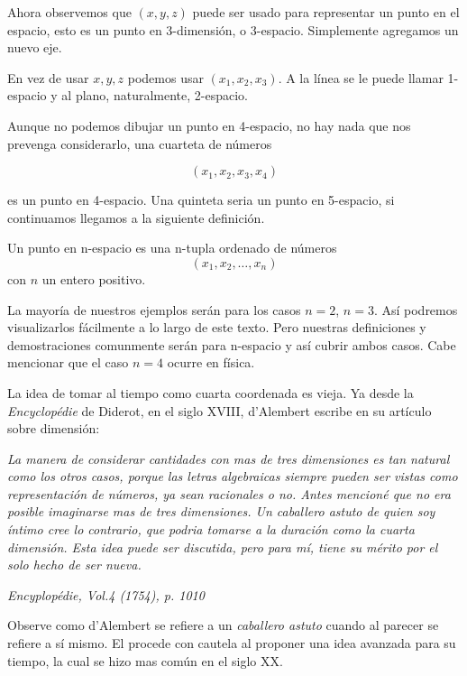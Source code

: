 Ahora observemos que $(x,y,z)$ puede ser usado para representar un punto en el espacio, esto es un
punto en 3-dimensión, o 3-espacio. Simplemente agregamos un nuevo eje.

En vez de usar $x,y,z$ podemos usar $(x_{1},x_{2},x_{3})$. A la línea se le puede llamar 1-espacio y
al plano, naturalmente, 2-espacio.

Aunque no podemos dibujar un punto en 4-espacio, no hay nada que nos prevenga considerarlo, una cuarteta
de números

$$(x_{1},x_{2},x_{3},x_{4})$$

es un punto en 4-espacio. Una quinteta seria un punto en 5-espacio, si continuamos llegamos a la siguiente
definición.

\begin{definition}
    Un punto en n-espacio es una n-tupla ordenado de números
    $$ (x_{1},x_{2}, \ldots ,x_{n}) $$
    con $n$ un entero positivo.
\end{definition}

La mayor\'ia de nuestros ejemplos serán para los casos $n=2$, $n=3$. Así podremos visualizarlos f\'acilmente a
lo largo de este texto. Pero nuestras definiciones y demostraciones comunmente serán para n-espacio y así
cubrir ambos casos. Cabe mencionar que el caso $n=4$ ocurre en física.

La idea de tomar al tiempo como cuarta coordenada es vieja. Ya desde la \emph{Encyclopédie} de Diderot, en
el siglo XVIII, d'Alembert escribe en su artículo sobre dimensión:

\vspace{0.5cm}

\emph{La manera de considerar cantidades con mas de tres dimensiones es tan natural como los otros casos,
porque las letras algebraicas siempre pueden ser vistas como representación de números, ya sean racionales
o no. Antes mencion\'e que no era posible imaginarse mas de tres dimensiones. Un caballero astuto de quien soy
íntimo cree lo contrario, que podria tomarse a la duración como la cuarta dimensión. Esta idea puede ser
discutida, pero para mí, tiene su mérito por el solo hecho de ser nueva.}

\begin{flushright}
    \emph{Encyplopédie, Vol.4 (1754), p. 1010}
\end{flushright}

Observe como d'Alembert se refiere a un \emph{caballero astuto} cuando al parecer se refiere a s\'i mismo. El procede
con cautela al proponer una idea avanzada para su tiempo, la cual se hizo mas común en el siglo XX.

